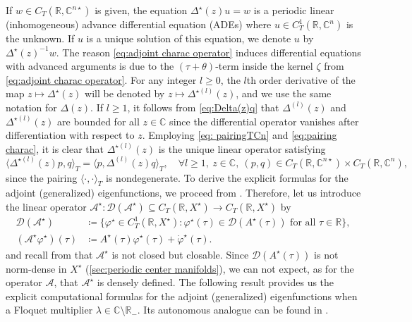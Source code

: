 \documentclass[english]{myarticle}
\begin{document}
\begin{sloppypar}
If $w \in C_T(\mathbb{R},\mathbb{C}^{n \star})$ is given, the equation $\Delta^\star(z)u = w$ is a periodic linear (inhomogeneous) advance differential equation (ADEs) where $u \in C_T^1(\mathbb{R},\mathbb{C}^n)$ is the unknown. If $u$ is a unique solution of this equation, we denote $u$ by $\Delta^\star(z)^{-1} w$. The reason \eqref{eq:adjoint charac operator} induces differential equations with advanced arguments is due to the $(\tau+\theta)$-term inside the kernel $\zeta$ from \eqref{eq:adjoint charac operator}. For any integer $l \geq 0$, the $l$th order derivative of the map $z \mapsto \Delta^\star(z)$ will be denoted by $z \mapsto \Delta^{\star (l)} (z)$, and we use the same notation for $\Delta(z)$. If $l \geq 1$, it follows from \eqref{eq:Delta(z)q} that $\Delta^{(l)}(z)$ and $\Delta^{ \star (l)}(z)$ are bounded for all $z \in \mathbb{C}$ since the differential operator vanishes after differentiation with respect to $z$. Employing \eqref{eq: pairingTCn} and \eqref{eq:pairing charac}, it is clear that $\Delta^{\star (l)}(z)$ is the unique linear operator satisfying
\begin{equation} \label{eq:pairing charac deri}
    \langle \Delta^{\star (l)}(z)p,q \rangle_T = \langle p,\Delta^{(l)}(z)q \rangle_T, \quad \forall l \geq 1, \ z \in \mathbb{C}, \ (p,q) \in C_T(\mathbb{R},\mathbb{C}^{n \star}) \times  C_T(\mathbb{R},\mathbb{C}^n),
\end{equation}
since the pairing $\langle \cdot, \cdot \rangle_T$ is nondegenerate. To derive the explicit formulas for the adjoint (generalized) eigenfunctions, we proceed from \cite[Section 3.2]{Article2}. Therefore, let us introduce the linear operator $\mathcal{A}^\star : \mathcal{D}(\mathcal{A}^\star) \subseteq C_T(\mathbb{R},X^\star)  \to C_T(\mathbb{R},X^\star)$ by
\begin{align*}
    \mathcal{D}(\mathcal{A}^\star) &\coloneqq \{ \varphi^\star \in C_T^1(\mathbb{R},X^\star) : \varphi^\star(\tau) \in \mathcal{D}(A^\star(\tau)) \mbox{ for all $\tau \in \mathbb{R}$} \}, \\
    (\mathcal{A}^\star\varphi^\star)(\tau) &\coloneqq A^\star(\tau)\varphi^\star(\tau) + \dot{\varphi}^\star(\tau).
\end{align*}
and recall from \cite[Proposition 14]{Article1} that $\mathcal{A}^\star$ is not closed but closable. Since $\mathcal{D}(A^\star(\tau))$ is not norm-dense in $X^\star$ (\cref{sec:periodic center manifolds}), we can not expect, as for the operator $\mathcal{A}$, that $\mathcal{A}^\star$ is densely defined. The following result provides us the explicit computational formulas for the adjoint (generalized) eigenfunctions when a Floquet multiplier $\lambda \in \mathbb{C} \setminus \mathbb{R}_{-}$. Its autonomous analogue can be found in \cite[Theorem IV.5.9]{Diekmann1995}.


\end{sloppypar}
\end{document}
